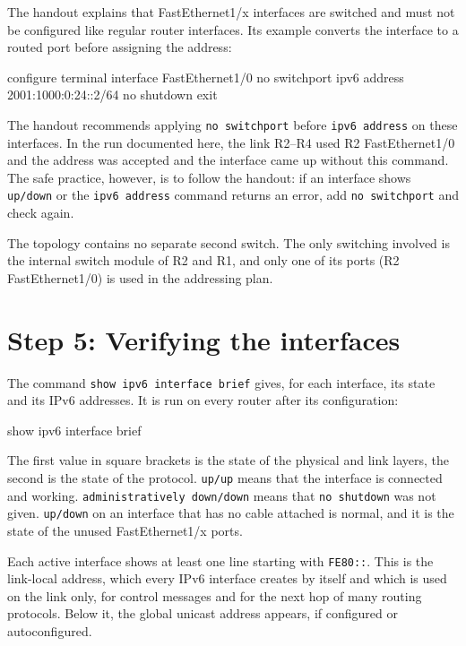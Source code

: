 The handout explains that FastEthernet1/x interfaces are switched and must not be configured like regular router interfaces. Its example converts the interface to a routed port before assigning the address:

\begin{codeblock}
configure terminal
interface FastEthernet1/0
 no switchport
 ipv6 address 2001:1000:0:24::2/64
 no shutdown
exit
\end{codeblock}

The handout recommends applying \texttt{no switchport} before \texttt{ipv6 address} on these interfaces. In the run documented here, the link R2--R4 used R2 FastEthernet1/0 and the address was accepted and the interface came up without this command. The safe practice, however, is to follow the handout: if an interface shows \texttt{up/down} or the \texttt{ipv6 address} command returns an error, add \texttt{no switchport} and check again.

The topology contains no separate second switch. The only switching involved is the internal switch module of R2 and R1, and only one of its ports (R2 FastEthernet1/0) is used in the addressing plan.

\section{Step 5: Verifying the interfaces}

The command \texttt{show ipv6 interface brief} gives, for each interface, its state and its IPv6 addresses. It is run on every router after its configuration:

\begin{codeblock}
show ipv6 interface brief
\end{codeblock}

The first value in square brackets is the state of the physical and link layers, the second is the state of the protocol. \texttt{up/up} means that the interface is connected and working. \texttt{administratively down/down} means that \texttt{no shutdown} was not given. \texttt{up/down} on an interface that has no cable attached is normal, and it is the state of the unused FastEthernet1/x ports.

Each active interface shows at least one line starting with \texttt{FE80::}. This is the link-local address, which every IPv6 interface creates by itself and which is used on the link only, for control messages and for the next hop of many routing protocols. Below it, the global unicast address appears, if configured or autoconfigured.

